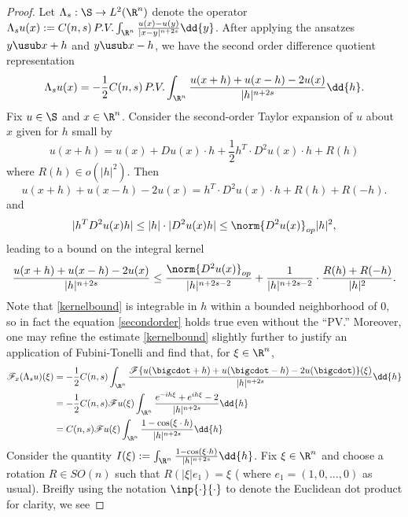 \documentclass[../main.tex]{subfiles}
\begin{document}
\begin{proof}
    Let $ \Lambda_{s}:\S\to L^{2}(\R^{n}) $ denote the operator $ \Lambda_{s}u(x) := C(n,s)\, P.V. \int_{\R^{n}}\frac{u(x)-u(y)}{|x-y|^{n+2s}}\dd{y} $. After applying the ansatzes $ y \usub x+h$ and $ y\usub x-h $, we have the second order difference quotient representation
    \begin{equation}\label{secondorder}
        \Lambda_{s}u(x) = -\frac{1}{2}C(n,s)\, P.V.\int_{\R^{n}} \frac{u(x+h) + u(x-h) -2u(x)}{|h|^{n+2s}} \dd{h}.
    \end{equation}
    Fix $ u\in \S $ and $ x\in \R^{n} $. Consider the second-order Taylor expansion of $ u $ about $ x $ given for $ h $ small by 
    \begin{equation}
        u(x+h) = u(x) + Du(x)\cdot h + \frac{1}{2}h^{T}\cdot D^{2}u(x)\cdot h + R(h)
    \end{equation}
    where $ R(h) \in o(|h|^{2}) $. Then 
    \[
        u(x+h)+u(x-h)-2u(x) = h^{T}\cdot D^{2}u(x)\cdot h + R(h) + R(-h).
    \]
    and 
    \[
        |h^{T}D^{2}u(x)h| \leq |h|\cdot |D^{2}u(x)h| \leq \norm{D^{2}u(x)}_{op}|h|^{2},
    \]
    leading to a bound on the integral kernel
    \begin{equation}\label{kernelbound}
        \frac{u(x+h)+u(x-h)-2u(x)}{|h|^{n+2s}} \leq \frac{\norm{D^{2}u(x)}_{op}}{|h|^{n+2s-2}} + \frac{1}{|h|^{n+2s-2}}\cdot\frac{R(h)+R(-h)}{|h|^{2}}.
    \end{equation}
    Note that \ref{kernelbound} is integrable in $ h $ within a bounded neighborhood of $ 0 $, so in fact the equation \ref{secondorder} holds true even without the ``PV.'' Moreover, one may refine the estimate \ref{kernelbound} slightly further to justify an application of Fubini-Tonelli and find that, for $ \xi\in \R^{n} $,
    \begin{align*}
        \mathscr{F}_{x} (\Lambda_{s}u)(\xi) &= -\frac{1}{2}C(n,s) \int_{\R^{n}} \frac{\mathscr{F}\{u(\bigcdot+h)+u(\bigcdot-h)-2u(\bigcdot)\}(\xi)}{|h|^{n+2s}} \dd{h} \\
        &= -\frac{1}{2}C(n,s) \mathscr{F}u(\xi)\int_{\R^{n}} \frac{e^{-ih \xi}+e^{ih \xi}-2}{|h|^{n+2s}}\dd{h} \\
        &= C(n,s) \mathscr{F}u(\xi)\int_{\R^{n}} \frac{1-\cos(\xi\cdot h)}{|h|^{n+2s}}\dd{h} \\
    \end{align*}
    Consider the quantity $ I(\xi):= \int_{\R^{n}} \frac{1-\cos(\xi\cdot h)}{|h|^{n+2s}}\dd{h} $. Fix $ \xi\in \R^{n} $ and choose a rotation $ R\in SO(n) $ such that $ R(| \xi|e_{1}) =  \xi $ ( where $ e_{1}= (1,0,\ldots,0) $ as usual). Breifly using the notation $ \inp{\cdot}{\cdot} $ to denote the Euclidean dot product for clarity, we see

\end{proof}
\end{document}
